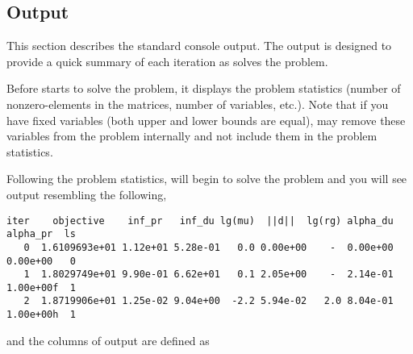 \subsection{Output}

This section describes the standard \IPOPT console output.
The output is designed to provide a quick summary of each iteration as \IPOPT solves the problem.

Before \IPOPT starts to solve the problem, it displays the problem statistics (number of nonzero-elements in the matrices, number of variables, etc.).
Note that if you have fixed variables (both upper and lower bounds are equal), \IPOPT may remove these variables from the problem internally and not include them in the problem statistics.

Following the problem statistics, \IPOPT will begin to solve the problem and you will see output resembling the following,
\begin{verbatim}
iter    objective    inf_pr   inf_du lg(mu)  ||d||  lg(rg) alpha_du alpha_pr  ls
   0  1.6109693e+01 1.12e+01 5.28e-01   0.0 0.00e+00    -  0.00e+00 0.00e+00   0
   1  1.8029749e+01 9.90e-01 6.62e+01   0.1 2.05e+00    -  2.14e-01 1.00e+00f  1
   2  1.8719906e+01 1.25e-02 9.04e+00  -2.2 5.94e-02   2.0 8.04e-01 1.00e+00h  1
\end{verbatim}
and the columns of output are defined as
